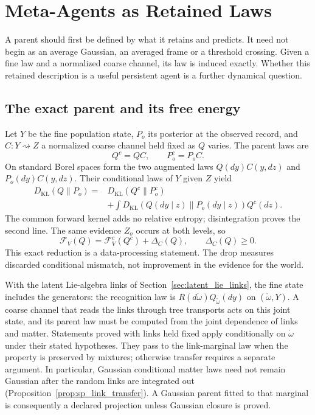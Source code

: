 \section{Meta-Agents as Retained Laws}\label{sec:meta_agent_formation}

A parent should first be defined by what it retains and predicts. It need not begin as an average Gaussian, an averaged frame or a threshold crossing. Given a fine law and a normalized coarse channel, its law is induced exactly. Whether this retained description is a useful persistent agent is a further dynamical question.

\subsection{The exact parent and its free energy}\label{sec:meta_agent_definition}
Let $Y$ be the fine population state, $P_o$ its posterior at the observed record, and $C:Y\rightsquigarrow Z$ a normalized coarse channel held fixed as $Q$ varies. The parent laws are
\begin{equation}
Q^c=QC,\qquad P_o^c=P_oC.
\label{eq:exact_parent_laws}
\end{equation}
On standard Borel spaces form the two augmented laws $Q(dy)C(y,dz)$ and $P_o(dy)C(y,dz)$. Their conditional laws of $Y$ given $Z$ yield
\begin{equation}
\begin{split}
D_{\mathrm{KL}}(Q\|P_o)
={}&D_{\mathrm{KL}}(Q^c\|P_o^c)\\
&+\int D_{\mathrm{KL}}(Q(dy\mid z)\|P_o(dy\mid z))Q^c(dz).
\end{split}
\label{eq:coarse_kl_chain}
\end{equation}
The common forward kernel adds no relative entropy; disintegration proves the second line. The same evidence $Z_o$ occurs at both levels, so
\begin{equation}
\mathcal F_V(Q)=\mathcal F_V^c(Q^c)+\Delta_C(Q),\qquad \Delta_C(Q)\geq0.
\label{eq:exact_coarse_vfe}
\end{equation}
This exact reduction is a data-processing statement. The drop measures discarded conditional mismatch, not improvement in the evidence for the world.

With the latent Lie-algebra links of Section~\ref{sec:latent_lie_links}, the fine state includes the generators: the recognition law is $R(d\mathring\omega)Q_{\mathring\omega}(dy)$ on $(\mathring\omega,Y)$. A coarse channel that reads the links through tree transports acts on this joint state, and its parent law must be computed from the joint dependence of links and matter. Statements proved with links held fixed apply conditionally on $\mathring\omega$ under their stated hypotheses. They pass to the link-marginal law when the property is preserved by mixtures; otherwise transfer requires a separate argument. In particular, Gaussian conditional matter laws need not remain Gaussian after the random links are integrated out (Proposition~\ref{prop:sp_link_transfer}). A Gaussian parent fitted to that marginal is consequently a declared projection unless Gaussian closure is proved.

